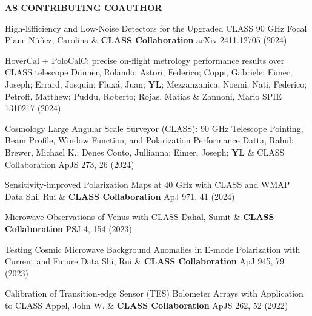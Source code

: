 \begin{footnotesize}
    \textsf{\textbf{ AS CONTRIBUTING COAUTHOR }}
\end{footnotesize}
\begin{etaremune}[topsep=0pt,itemsep=0pt,partopsep=0pt,parsep=0pt]
    \renewcommand\labelenumi{\footnotesize\bfseries\theenumi.}
    
            {High-Efficiency and Low-Noise Detectors for the Upgraded CLASS 90 GHz Focal Plane}
            {Núñez, Carolina \& \textbf{CLASS Collaboration}}
            {arXiv 2411.12705 (2024)}
    
            {HoverCal + PoloCalC: precise on-flight metrology performance results over CLASS telescope}
            {Dünner, Rolando; Astori, Federico; Coppi, Gabriele; Eimer, Joseph; Errard, Josquin; Fluxá, Juan; \textbf{YL}; Mezzanzanica, Noemi; Nati, Federico; Petroff, Matthew; Puddu, Roberto; Rojas, Matías \& Zannoni, Mario}
            {SPIE 1310217 (2024)}
    
            {Cosmology Large Angular Scale Surveyor (CLASS): 90 GHz Telescope Pointing, Beam Profile, Window Function, and Polarization Performance}
            {Datta, Rahul; Brewer, Michael K.; Denes Couto, Jullianna; Eimer, Joseph; \textbf{YL} \& CLASS Collaboration}
            {ApJS 273, 26 (2024)}
    
            {Sensitivity-improved Polarization Maps at 40 GHz with CLASS and WMAP Data}
            {Shi, Rui \& \textbf{CLASS Collaboration}}
            {ApJ 971, 41 (2024)}
    
            {Microwave Observations of Venus with CLASS}
            {Dahal, Sumit \& \textbf{CLASS Collaboration}}
            {PSJ 4, 154 (2023)}
    
            {Testing Cosmic Microwave Background Anomalies in E-mode Polarization with Current and Future Data}
            {Shi, Rui \& \textbf{CLASS Collaboration}}
            {ApJ 945, 79 (2023)}
    
            {Calibration of Transition-edge Sensor (TES) Bolometer Arrays with Application to CLASS}
            {Appel, John W. \& \textbf{CLASS Collaboration}}
            {ApJS 262, 52 (2022)}
    

\end{etaremune}
